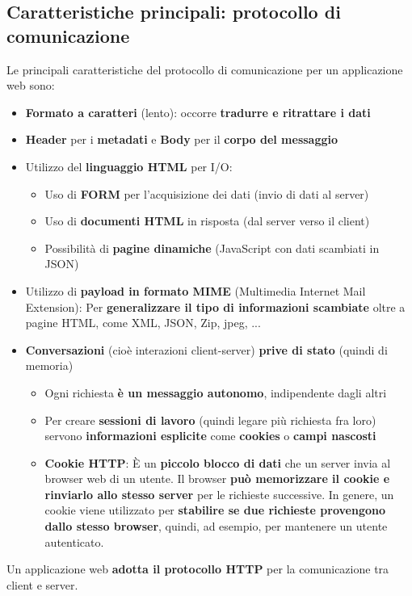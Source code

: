 \documentclass[12pt]{article}
\begin{document}
\subsection{Caratteristiche principali: protocollo di comunicazione}
Le principali caratteristiche del protocollo di comunicazione per un applicazione web sono:
\begin{itemize}
    \item \textbf{Formato a caratteri} (lento): occorre \textbf{tradurre e ritrattare i dati}
    \item \textbf{Header} per i \textbf{metadati} e \textbf{Body} per il \textbf{corpo del messaggio}
    \item Utilizzo del \textbf{linguaggio HTML} per I/O:
    \begin{itemize}
        \item Uso di \textbf{FORM} per l'acquisizione dei dati (invio di dati al server)
        \item Uso di \textbf{documenti HTML} in risposta (dal server verso il client)
        \item Possibilità di \textbf{pagine dinamiche} (JavaScript con dati scambiati in JSON)
    \end{itemize}
    \item Utilizzo di \textbf{payload in formato MIME} (Multimedia Internet Mail Extension): Per \textbf{generalizzare il tipo di informazioni scambiate} oltre a pagine HTML, come XML, JSON, Zip, jpeg, ...
    \item \textbf{Conversazioni} (cioè interazioni client-server) \textbf{prive di stato} (quindi di memoria)
    \begin{itemize}
        \item Ogni richiesta \textbf{è un messaggio autonomo}, indipendente dagli altri
        \item Per creare \textbf{sessioni di lavoro} (quindi legare più richiesta fra loro) servono \textbf{informazioni esplicite} come \textbf{cookies} o \textbf{campi nascosti}
        \item \textbf{Cookie HTTP}: È un \textbf{piccolo blocco di dati} che un server invia al browser web di un utente. Il browser \textbf{può memorizzare il cookie e rinviarlo allo stesso server} per le richieste successive.
        In genere, un cookie viene utilizzato per \textbf{stabilire se due richieste provengono dallo stesso browser}, quindi, ad esempio, per mantenere un utente autenticato.
    \end{itemize}
\end{itemize}
Un applicazione web \textbf{adotta il protocollo HTTP} per la comunicazione tra client e server.
\end{document}
